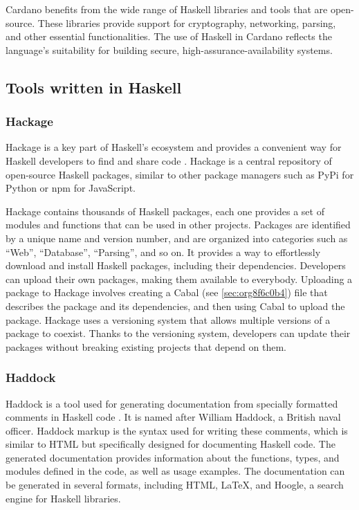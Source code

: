 \documentclass[a4paper, titlepage, twoside]{article}
\begin{document}
Cardano benefits from the wide range of Haskell libraries and tools that are open-source. These libraries provide support for cryptography, networking, parsing, and other essential functionalities. The use of Haskell in Cardano reflects the language's suitability for building secure, high-assurance-availability systems.

\subsection{Tools written in Haskell}
\label{sec:org8772de1}

\subsubsection{Hackage}
\label{sec:orgfbc5b2d}

Hackage is a key part of Haskell's ecosystem and provides a convenient way for Haskell developers to find and share code \autocite{hackageHackage2023}. Hackage is a central repository of open-source Haskell packages, similar to other package managers such as PyPi for Python or npm for JavaScript.

Hackage contains thousands of Haskell packages, each one provides a set of modules and functions that can be used in other projects.  Packages are identified by a unique name and version number, and are organized into categories such as ``Web'', ``Database'', ``Parsing'', and so on. It provides a way to effortlessly download and install Haskell packages, including their dependencies. Developers can upload their own packages, making them available to everybody. Uploading a package to Hackage involves creating a Cabal (see \ref{sec:org8f6c0b4}) file that describes the package and its dependencies, and then using Cabal to upload the package. Hackage uses a versioning system that allows multiple versions of a package to coexist. Thanks to the versioning system, developers can update their packages without breaking existing projects that depend on them.

\subsubsection{Haddock}
\label{sec:org90315a3}

Haddock is a tool used for generating documentation from specially formatted comments in Haskell code \autocite{haddockHaddockDocumentation2023}. It is named after William Haddock, a British naval officer. Haddock markup is the syntax used for writing these comments, which is similar to HTML but specifically designed for documenting Haskell code. The generated documentation provides information about the functions, types, and modules defined in the code, as well as usage examples. The documentation can be generated in several formats, including HTML, \LaTeX{}, and Hoogle, a search engine for Haskell libraries.
\end{document}
